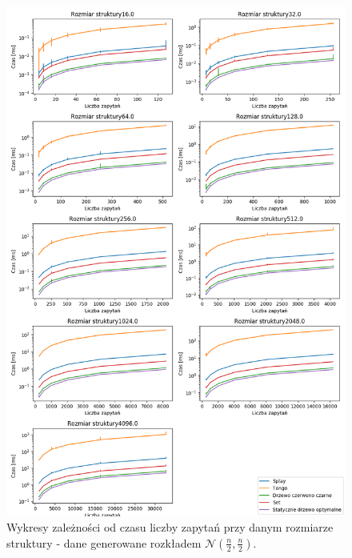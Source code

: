 \documentclass[declaration,shortabstract]{iithesis}
\theoremstyle{thm}
\theoremstyle{remark}
\theoremstyle{plain}
\theoremstyle{plain}
\theoremstyle{plain}
\begin{document}
\begin{figure}[H]  
\centering
    \includegraphics[scale=0.5]{wykresy/gaus05.png}
      \caption{Wykresy zależności od czasu liczby zapytań przy danym rozmiarze struktury - dane generowane rozkładem \(\mathcal{N}(\frac{n}{2}, \frac{n}{2})\). }  
    \label{fig:zigzig} 
\end{figure}
\end{document}
